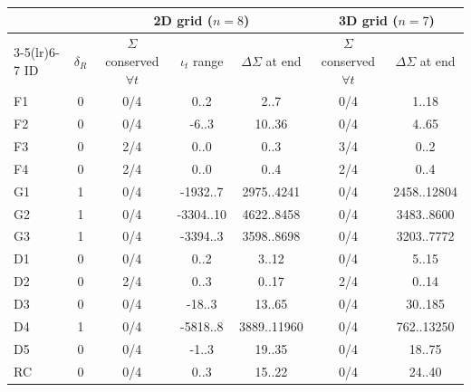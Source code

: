 \begin{tabular}{lcccccc}
\toprule
 & & \multicolumn{3}{c}{2D grid ($n=8$)} & \multicolumn{2}{c}{3D grid ($n=7$)}\\
\cmidrule(lr){3-5}\cmidrule(lr){6-7}
ID & $\delta_R$ & $\Sigma$ conserved $\forall t$ & $\iota_t$ range & $\Delta\Sigma$ at end & $\Sigma$ conserved $\forall t$ & $\Delta\Sigma$ at end\\
\midrule
F1 & 0 & 0/4 & 0..2 & 2..7 & 0/4 & 1..18\\
F2 & 0 & 0/4 & -6..3 & 10..36 & 0/4 & 4..65\\
F3 & 0 & 2/4 & 0..0 & 0..3 & 3/4 & 0..2\\
F4 & 0 & 2/4 & 0..0 & 0..4 & 2/4 & 0..4\\
G1 & 1 & 0/4 & -1932..7 & 2975..4241 & 0/4 & 2458..12804\\
G2 & 1 & 0/4 & -3304..10 & 4622..8458 & 0/4 & 3483..8600\\
G3 & 1 & 0/4 & -3394..3 & 3598..8698 & 0/4 & 3203..7772\\
D1 & 0 & 0/4 & 0..2 & 3..12 & 0/4 & 5..15\\
D2 & 0 & 2/4 & 0..3 & 0..17 & 2/4 & 0..14\\
D3 & 0 & 0/4 & -18..3 & 13..65 & 0/4 & 30..185\\
D4 & 1 & 0/4 & -5818..8 & 3889..11960 & 0/4 & 762..13250\\
D5 & 0 & 0/4 & -1..3 & 19..35 & 0/4 & 18..75\\
RC & 0 & 0/4 & 0..3 & 15..22 & 0/4 & 24..40\\
\bottomrule
\end{tabular}
